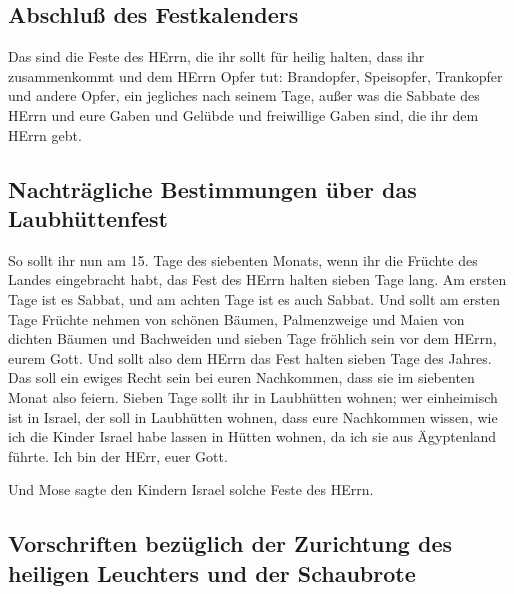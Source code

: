 \hypertarget{abschluuxdf-des-festkalenders}{%
\subsection{Abschluß des
Festkalenders}\label{abschluuxdf-des-festkalenders}}

 Das sind die Feste des HErrn, die ihr sollt für heilig
halten, dass ihr zusammenkommt und dem HErrn Opfer tut: Brandopfer,
Speisopfer, Trankopfer und andere Opfer, ein jegliches nach seinem Tage,
 außer was die Sabbate des HErrn und eure Gaben und
Gelübde und freiwillige Gaben sind, die ihr dem HErrn gebt.

\hypertarget{nachtruxe4gliche-bestimmungen-uxfcber-das-laubhuxfcttenfest}{%
\subsection{Nachträgliche Bestimmungen über das
Laubhüttenfest}\label{nachtruxe4gliche-bestimmungen-uxfcber-das-laubhuxfcttenfest}}

 So sollt ihr nun am 15. Tage des siebenten Monats, wenn
ihr die Früchte des Landes eingebracht habt, das Fest des HErrn halten
sieben Tage lang. Am ersten Tage ist es Sabbat, und am achten Tage ist
es auch Sabbat.  Und sollt am ersten Tage Früchte nehmen
von schönen Bäumen, Palmenzweige und Maien von dichten Bäumen und
Bachweiden und sieben Tage fröhlich sein vor dem HErrn, eurem Gott.
 Und sollt also dem HErrn das Fest halten sieben Tage des
Jahres. Das soll ein ewiges Recht sein bei euren Nachkommen, dass sie im
siebenten Monat also feiern.  Sieben Tage sollt ihr in
Laubhütten wohnen; wer einheimisch ist in Israel, der soll in Laubhütten
wohnen,  dass eure Nachkommen wissen, wie ich die Kinder
Israel habe lassen in Hütten wohnen, da ich sie aus Ägyptenland führte.
Ich bin der HErr, euer Gott.

 Und Mose sagte den Kindern Israel solche Feste des
HErrn.

\hypertarget{vorschriften-bezuxfcglich-der-zurichtung-des-heiligen-leuchters-und-der-schaubrote}{%
\subsection{Vorschriften bezüglich der Zurichtung des heiligen Leuchters
und der
Schaubrote}\label{vorschriften-bezuxfcglich-der-zurichtung-des-heiligen-leuchters-und-der-schaubrote}}

